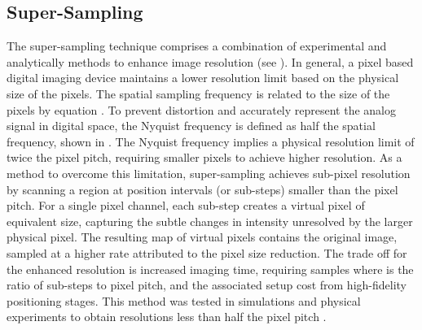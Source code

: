 \documentclass[../../../main.tex]{subfiles}
\begin{document}
%
    \subsection{Super-Sampling}%
    \label{sec:chapter-3:imaging-techniques:super-sampling}%
    The \gls{super-sampling} technique comprises a combination of experimental and analytically methods to enhance image resolution (see ).
    In general, a pixel based digital imaging device maintains a lower resolution limit based on the physical size of the pixels.
    The spatial sampling frequency  is related to the size of the pixels  by equation .
    To prevent distortion and accurately represent the analog signal in digital space, the Nyquist frequency  is defined as half the spatial frequency, shown in .
    The Nyquist frequency implies a physical resolution limit of twice the pixel pitch, requiring smaller pixels to achieve higher resolution.
    As a method to overcome this limitation, \gls{super-sampling} achieves sub-pixel resolution by scanning a region at position intervals (or sub-steps) smaller than the pixel pitch.
    For a single pixel channel, each sub-step creates a virtual pixel of equivalent size, capturing the subtle changes in intensity unresolved by the larger physical pixel.
    The resulting map of virtual pixels contains the original image, sampled at a higher rate attributed to the pixel size reduction.
    The trade off for the enhanced resolution is increased imaging time, requiring  samples where  is the ratio of sub-steps to pixel pitch, and the associated setup cost from high-fidelity positioning stages.
    This method was tested in simulations and physical experiments to obtain resolutions less than half the pixel pitch \cite{Herrera_2016}.
\end{document}
